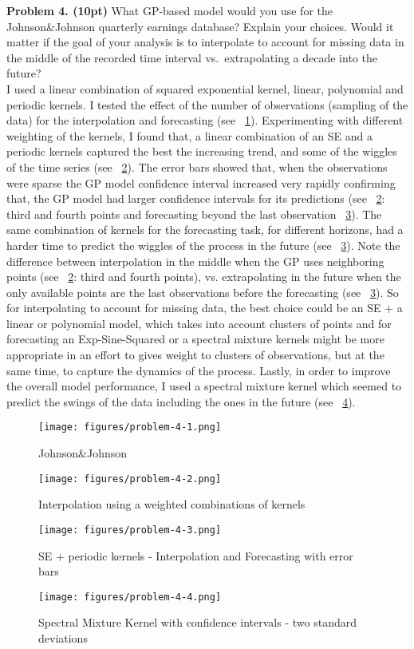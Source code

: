\documentclass[12pt]{article}
\begin{document}
\noindent \textbf{Problem 4. (10pt)} 
What GP-based model would you use for the Johnson\&Johnson quarterly earnings database?
Explain your choices. Would it matter if the goal of your analysis is to interpolate to account for missing data in the middle of the recorded time interval vs.\ extrapolating a decade into the future?\\

I used a linear combination of squared exponential kernel, linear, polynomial and periodic kernels. 
I tested the effect of the number of observations (sampling of the data) for the interpolation and forecasting (see ~\ref{problem41}).
Experimenting with different weighting of the kernels, I found that, a linear combination of  an SE and a periodic kernels captured the best the increasing trend, and some of the wiggles of the time series (see  ~\ref{problem42}).
The error bars showed that, when the observations were sparse the GP model confidence interval increased very rapidly confirming that,
 the GP model had larger confidence intervals for its predictions (see  ~\ref{problem42}: third and fourth points and forecasting beyond the last observation ~\ref{problem43}).
The same combination of kernels for the forecasting task, for different horizons, had a harder time to predict the wiggles of the process in the future (see  ~\ref{problem43}). 
Note the difference between interpolation in the middle when the GP uses neighboring points (see  ~\ref{problem42}: third and fourth points), vs. extrapolating in the future 
when the only available points are the last observations before the forecasting (see  ~\ref{problem43}). 
So for interpolating to account for missing data, the best choice could be an SE + a linear or polynomial model, which takes into account clusters of points and 
for forecasting an Exp-Sine-Squared  or a spectral mixture kernels might be more appropriate in an effort to gives weight to clusters of observations, but at the same time, to capture the dynamics of the process.
Lastly, in order to improve the overall model performance, I used a spectral mixture kernel which seemed to predict the swings of the data including the ones in the future (see  ~\ref{problem44}).

\begin{figure}
	\centering
	\texttt{[image: figures/problem-4-1.png]} 
	\caption{Johnson\&Johnson}
	\label{problem41}
\end{figure}
\begin{figure}
	\centering
	\texttt{[image: figures/problem-4-2.png]} 
	\caption{Interpolation using a weighted combinations of kernels}
	\label{problem42}
\end{figure}
\begin{figure}
	\centering
	\texttt{[image: figures/problem-4-3.png]} 
	\caption{SE + periodic kernels - Interpolation and Forecasting with error bars}
	\label{problem43}
\end{figure}
\begin{figure}
	\centering
	\texttt{[image: figures/problem-4-4.png]} 
	\caption{Spectral Mixture Kernel with confidence intervals - two standard deviations}
	\label{problem44}
\end{figure}
\end{document}
